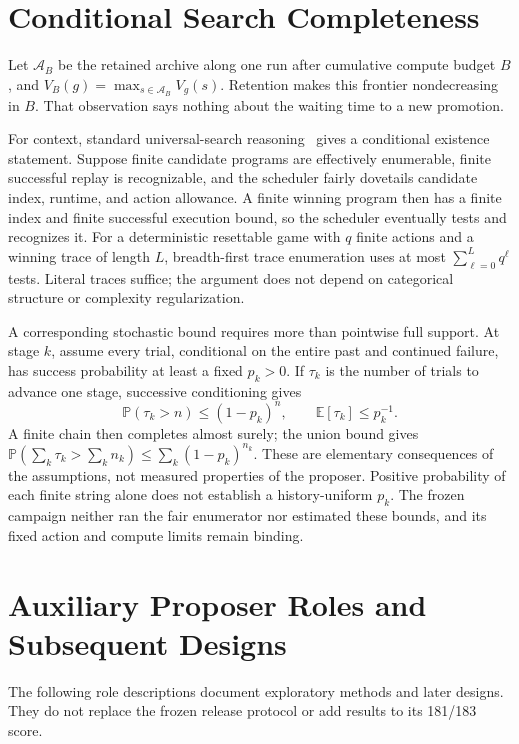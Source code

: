 \documentclass[11pt]{article}
\theoremstyle{definition}
\theoremstyle{remark}
\newcommand{\E}{\mathbb{E}}
\newcommand{\Prb}{\mathbb{P}}
\begin{document}
\section{Conditional Search Completeness}
\label{sec:compute}
Let $\mathcal A_B$ be the retained archive along one run after cumulative compute
budget $B$, and $V_B(g)=\max_{s\in\mathcal A_B}V_g(s)$. Retention makes this
frontier nondecreasing in $B$. That observation says nothing about the waiting time
to a new promotion.

For context, standard universal-search reasoning~\cite{levin1973} gives a
conditional existence statement. Suppose finite candidate programs are effectively
enumerable, finite successful replay is recognizable, and the scheduler fairly
dovetails candidate index, runtime, and action allowance. A finite winning program
then has a finite index and finite successful execution bound, so the scheduler
eventually tests and recognizes it. For a deterministic resettable game with $q$
finite actions and a winning trace of length $L$, breadth-first trace enumeration
uses at most $\sum_{\ell=0}^{L}q^\ell$ tests. Literal traces suffice; the argument
does not depend on categorical structure or complexity regularization.

A corresponding stochastic bound requires more than pointwise full support. At
stage $k$, assume every trial, conditional on the entire past and continued failure,
has success probability at least a fixed $p_k>0$. If $\tau_k$ is the number of trials
to advance one stage, successive conditioning gives
\begin{equation}
 \Prb(\tau_k>n)\le(1-p_k)^n,\qquad \E[\tau_k]\le p_k^{-1}.
 \label{eq:geometric-stage}
\end{equation}
A finite chain then completes almost surely; the union bound gives
$\Prb(\sum_k\tau_k>\sum_kn_k)\le\sum_k(1-p_k)^{n_k}$.
These are elementary consequences of the assumptions, not measured properties of
the proposer. Positive probability of each finite string alone does not establish
a history-uniform $p_k$. The frozen campaign neither ran the fair enumerator nor
estimated these bounds, and its fixed action and compute limits remain binding.

\section{Auxiliary Proposer Roles and Subsequent Designs}
\label{sec:auxiliary}
The following role descriptions document exploratory methods and later designs.
They do not replace the frozen release protocol or add results to its 181/183 score.
\end{document}
